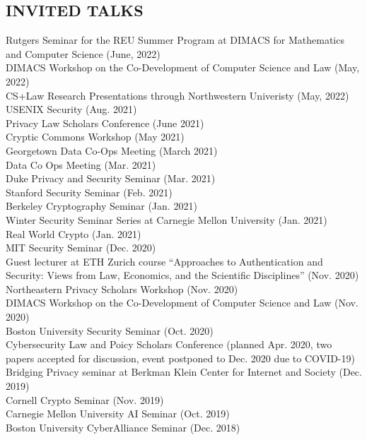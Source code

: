 \documentclass{res}
\begin{document}
\begin{resume}
\section{INVITED TALKS}
\vspace{0.1in}
Rutgers Seminar for the REU Summer Program at DIMACS for Mathematics and Computer Science (June, 2022) \\
DIMACS Workshop on the Co-Development of Computer Science and Law (May, 2022) \\
CS+Law Research Presentations through Northwestern Univeristy (May, 2022)
USENIX Security (Aug. 2021) \\
Privacy Law Scholars Conference (June 2021) \\
Cryptic Commons Workshop (May 2021) \\
Georgetown Data Co-Ops Meeting (March 2021) \\
Data Co Ops Meeting (Mar. 2021) \\
Duke Privacy and Security Seminar (Mar. 2021) \\
Stanford Security Seminar (Feb. 2021) \\
Berkeley Cryptography Seminar (Jan. 2021) \\
Winter Security Seminar Series at Carnegie Mellon University (Jan. 2021) \\
Real World Crypto (Jan. 2021) \\
MIT Security Seminar (Dec. 2020) \\
Guest lecturer at ETH Zurich course ``Approaches to Authentication and Security: Views from Law,
Economics, and the Scientific Disciplines'' (Nov. 2020) \\
Northeastern Privacy Scholars Workshop (Nov. 2020) \\
DIMACS Workshop on the Co-Development of Computer Science and Law (Nov. 2020) \\
Boston University Security Seminar (Oct. 2020) \\
Cybersecurity Law and Poicy Scholars Conference (planned Apr. 2020, two papers accepted for
discussion, event postponed to Dec. 2020 due to COVID-19) \\
Bridging Privacy seminar at Berkman Klein Center for Internet and Society (Dec. 2019) \\ 
Cornell Crypto Seminar (Nov. 2019) \\
Carnegie Mellon University AI Seminar (Oct. 2019) \\
Boston University CyberAlliance Seminar (Dec. 2018) \\


\end{resume}
\end{document}
